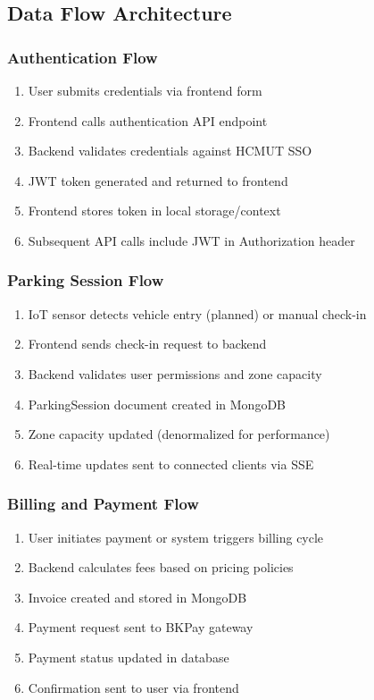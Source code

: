 \subsection{Data Flow Architecture}

\subsubsection{Authentication Flow}
\begin{enumerate}
\item User submits credentials via frontend form
\item Frontend calls authentication API endpoint
\item Backend validates credentials against HCMUT SSO
\item JWT token generated and returned to frontend
\item Frontend stores token in local storage/context
\item Subsequent API calls include JWT in Authorization header
\end{enumerate}

\subsubsection{Parking Session Flow}
\begin{enumerate}
\item IoT sensor detects vehicle entry (planned) or manual check-in
\item Frontend sends check-in request to backend
\item Backend validates user permissions and zone capacity
\item ParkingSession document created in MongoDB
\item Zone capacity updated (denormalized for performance)
\item Real-time updates sent to connected clients via SSE
\end{enumerate}

\subsubsection{Billing and Payment Flow}
\begin{enumerate}
\item User initiates payment or system triggers billing cycle
\item Backend calculates fees based on pricing policies
\item Invoice created and stored in MongoDB
\item Payment request sent to BKPay gateway
\item Payment status updated in database
\item Confirmation sent to user via frontend
\end{enumerate}

